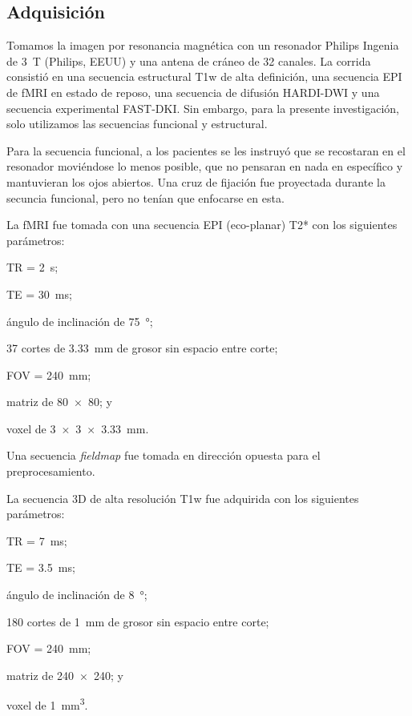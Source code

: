 \subsection{Adquisición}
Tomamos la imagen por resonancia magnética con un resonador Philips Ingenia de \SI{3}{\tesla} (Philips, EEUU) y una antena de cráneo de 32 canales. La corrida consistió en una secuencia estructural T1w de alta definición, una secuencia EPI de fMRI en estado de reposo, una secuencia de difusión HARDI-DWI y una secuencia experimental FAST-DKI. Sin embargo, para la presente investigación, solo utilizamos las secuencias funcional y estructural.\par
Para la secuencia funcional, a los pacientes se les instruyó que se recostaran en el resonador moviéndose lo menos posible, que no pensaran en nada en específico y mantuvieran los ojos abiertos. Una cruz de fijación fue proyectada durante la secuncia funcional, pero no tenían que enfocarse en esta. \par
La fMRI fue tomada con una secuencia EPI (eco-planar) T2* con los siguientes parámetros:
\begin{enumerate*}[label=\emph{\alph*})]
    \item TR = \SI{2}{\second};
    \item TE = \SI{30}{\milli\second};
    \item ángulo de inclinación de \SI{75}{\degree};
    \item 37 cortes de \SI{3.33}{\milli\meter} de grosor sin espacio entre corte;
    \item FOV = \SI{240}{\milli\meter};
    \item matriz de \num{80x80}; y
    \item voxel de \SI[product-units=single]{3x3x3.33}{\milli\meter}.
\end{enumerate*}
Una secuencia \textit{fieldmap} fue tomada en dirección opuesta para el preprocesamiento.\par
La secuencia 3D de alta resolución T1w fue adquirida con los siguientes parámetros:
\begin{enumerate*}[label=\emph{\alph*})]
    \item TR = \SI{7}{\milli\second};
    \item TE = \SI{3.5}{\milli\second};
    \item ángulo de inclinación de \SI{8}{\degree};
    \item 180 cortes de \SI{1}{\milli\meter} de grosor sin espacio entre corte;
    \item FOV = \SI{240}{\milli\meter};
    \item matriz de \num{240x240}; y
    \item voxel de \SI[product-units=single]{1}{\milli\meter\cubed}.
\end{enumerate*}

